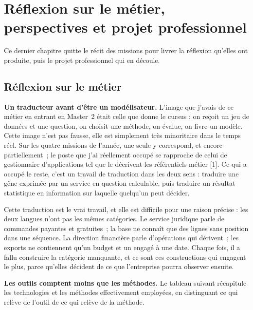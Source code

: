 
\chapter{Réflexion sur le métier, perspectives et projet professionnel}
\minitoc
\newpage

Ce dernier chapitre quitte le récit des missions pour livrer la réflexion qu'elles ont
produite, puis le projet professionnel qui en découle.

\hypertarget{ruxe9flexion-sur-le-muxe9tier}{%
\section{Réflexion sur le métier}\label{ruxe9flexion-sur-le-muxe9tier}}

\textbf{Un traducteur avant d'être un modélisateur.} L'image que j'avais de ce métier en entrant en
Master~2 était celle que donne le cursus : on reçoit un jeu de données et une question, on
choisit une méthode, on évalue, on livre un modèle. Cette image n'est pas fausse, elle est
simplement très minoritaire dans le temps réel. Sur les quatre missions de l'année, une seule
y correspond, et encore partiellement~; le poste que j'ai réellement occupé se rapproche de
celui de gestionnaire d'applications tel que le décrivent les référentiels métier {[}1{]}. Ce qui
a occupé le reste, c'est un travail de traduction dans les deux sens : traduire une gêne
exprimée par un service en question calculable, puis traduire un résultat statistique en
information sur laquelle quelqu'un peut décider.

Cette traduction est le vrai travail, et elle est difficile pour une raison précise : les deux
langues n'ont pas les mêmes catégories. Le service juridique parle de commandes payantes et
gratuites~; la base ne connaît que des lignes sans position dans une séquence. La direction
financière parle d'opérations qui dérivent~; les exports ne contiennent qu'un budget et un
engagé à une date. Chaque fois, il a fallu construire la catégorie manquante, et ce sont ces
constructions qui engagent le plus, parce qu'elles décident de ce que l'entreprise pourra
observer ensuite.

\textbf{Les outils comptent moins que les méthodes.} Le tableau suivant récapitule les technologies
et les méthodes effectivement employées, en distinguant ce qui relève de l'outil de ce qui
relève de la méthode.

